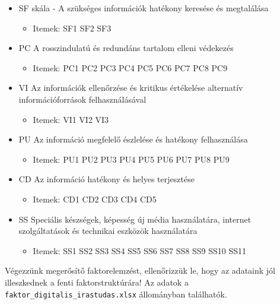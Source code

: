 \documentclass[
  letterpaper,
]{krantz}
\providecommand{\tightlist}{%
  \setlength{\itemsep}{0pt}\setlength{\parskip}{0pt}}\usepackage{longtable,booktabs,array}
\begin{document}
\begin{itemize}
\tightlist
\item
  SF skála - A szükséges információk hatékony keresése és megtalálása

  \begin{itemize}
  \tightlist
  \item
    Itemek: SF1 SF2 SF3
  \end{itemize}
\item
  PC A rosszindulatú és redundáns tartalom elleni védekezés

  \begin{itemize}
  \tightlist
  \item
    Itemek: PC1 PC2 PC3 PC4 PC5 PC6 PC7 PC8 PC9
  \end{itemize}
\item
  VI Az információk ellenőrzése és kritikus értékelése alternatív
  információforrások felhasználásával

  \begin{itemize}
  \tightlist
  \item
    Itemek: VI1 VI2 VI3
  \end{itemize}
\item
  PU Az információ megfelelő észlelése és hatékony felhasználása

  \begin{itemize}
  \tightlist
  \item
    Itemek: PU1 PU2 PU3 PU4 PU5 PU6 PU7 PU8 PU9
  \end{itemize}
\item
  CD Az információ hatékony és helyes terjesztése

  \begin{itemize}
  \tightlist
  \item
    Itemek: CD1 CD2 CD3 CD4 CD5
  \end{itemize}
\item
  SS Speciális készségek, képesség új média használatára, internet
  szolgáltatások és technikai eszközök használatára

  \begin{itemize}
  \tightlist
  \item
    Itemek: SS1 SS2 SS3 SS4 SS5 SS6 SS7 SS8 SS9 SS10 SS11
  \end{itemize}
\end{itemize}

Végezzünk megerősítő faktorelemzést, ellenőrizzük le, hogy az adataink
jól illeszkednek a fenti faktorstruktúrára! Az adatok a
\texttt{faktor\_digitalis\_irastudas.xlsx} állományban találhatók.
\end{document}

